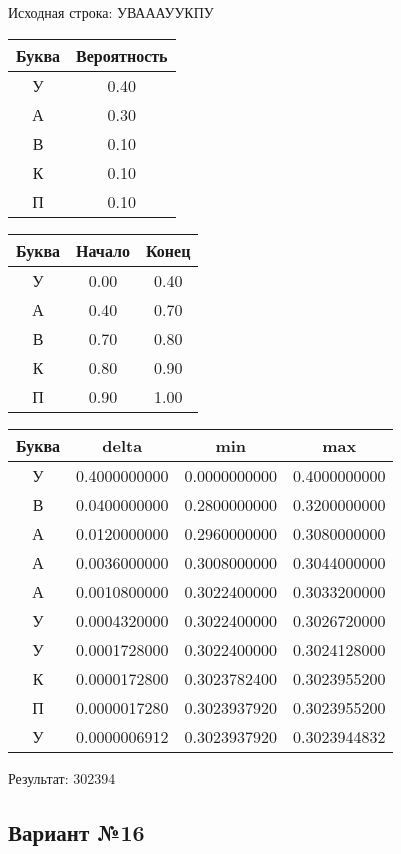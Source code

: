 \documentclass[a4paper, 12pt]{article}
\begin{document}
Исходная строка: УВАААУУКПУ\
\begin{center}
 \begin{tabular}{ |c|c| } 
  \hline
     Буква & Вероятность \\ \hline
У & 0.40\\\hline
А & 0.30\\\hline
В & 0.10\\\hline
К & 0.10\\\hline
П & 0.10
\\ \hline \end{tabular}
\end{center}
\begin{center}
 \begin{tabular}{ |c|c|c| } 
  \hline
     Буква & Начало & Конец \\ \hline
У & 0.00 & 0.40\\\hline
А & 0.40 & 0.70\\\hline
В & 0.70 & 0.80\\\hline
К & 0.80 & 0.90\\\hline
П & 0.90 & 1.00
\\ \hline \end{tabular}
\end{center}
\begin{center}
 \begin{tabular}{ |c|c|c|c| } 
  \hline
     Буква & delta & min & max \\ \hline
У & 0.4000000000 & 0.0000000000 & 0.4000000000\\\hline
В & 0.0400000000 & 0.2800000000 & 0.3200000000\\\hline
А & 0.0120000000 & 0.2960000000 & 0.3080000000\\\hline
А & 0.0036000000 & 0.3008000000 & 0.3044000000\\\hline
А & 0.0010800000 & 0.3022400000 & 0.3033200000\\\hline
У & 0.0004320000 & 0.3022400000 & 0.3026720000\\\hline
У & 0.0001728000 & 0.3022400000 & 0.3024128000\\\hline
К & 0.0000172800 & 0.3023782400 & 0.3023955200\\\hline
П & 0.0000017280 & 0.3023937920 & 0.3023955200\\\hline
У & 0.0000006912 & 0.3023937920 & 0.3023944832
\\ \hline \end{tabular}
\end{center}
Результат: 302394
\pagebreak
\subsection{Вариант №16}
\end{document}
